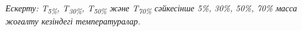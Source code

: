 % 
% 
% 
% 
% 
% 

\emph{Ескерту: T\textsubscript{5\%}, T\textsubscript{30\%},
T\textsubscript{50\%} және T\textsubscript{70\%} сәйкесінше 5\%, 30\%,
50\%, 70\% масса жоғалту кезіндегі температуралар.}

